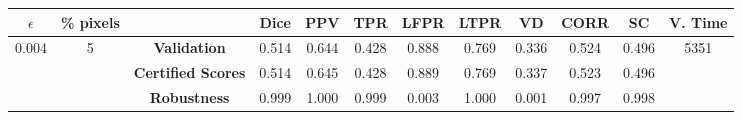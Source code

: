 \begin{longtable}{ c  c | c | c  c  c  c  c  c  c c c}
\toprule \textbf{$\epsilon$} & \textbf{\% pixels} & & \textbf{Dice} & \textbf{PPV} & \textbf{TPR} & \textbf{LFPR} & \textbf{LTPR} & \textbf{VD} & \textbf{CORR} & \textbf{SC} & \textbf{V. Time} \\
\midrule 
\multirow{3}{*}{0.004}  & \multirow{3}{*}{5} &\textbf{Validation} & 0.514 & 0.644 & 0.428 & 0.888 & 0.769 & 0.336 & 0.524 & 0.496 & \multirow{3}{*}{5351} \\
 & & \textbf{Certified Scores} & 0.514 & 0.645 & 0.428 & 0.889 & 0.769 & 0.337 & 0.523 & 0.496 & \\
& & \textbf{Robustness} & 0.999 & 1.000 & 0.999 & 0.003 & 1.000 & 0.001 & 0.997 & 0.998 & \\
\end{longtable}